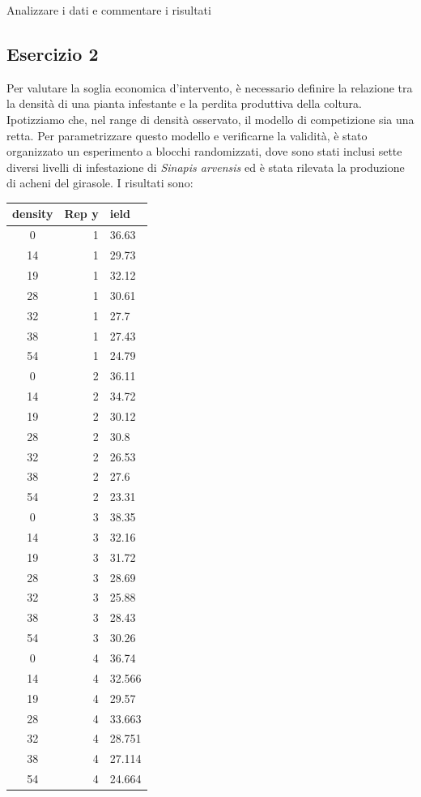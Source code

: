 \documentclass[a4paper,12pt,oneside]{book}
\begin{document}
Analizzare i dati e commentare i risultati

\hypertarget{esercizio-2-7}{%
\subsection{Esercizio 2}\label{esercizio-2-7}}

Per valutare la soglia economica d'intervento, è necessario definire la relazione tra la densità di una pianta infestante e la perdita produttiva della coltura. Ipotizziamo che, nel range di densità osservato, il modello di competizione sia una retta. Per parametrizzare questo modello e verificarne la validità, è stato organizzato un esperimento a blocchi randomizzati, dove sono stati inclusi sette diversi livelli di infestazione di \emph{Sinapis arvensis} ed è stata rilevata la produzione di acheni del girasole. I risultati sono:

\begin{longtable}[]{@{}crl@{}}
\toprule
density & Rep y & ield \\
\midrule
\endhead
0 & 1 & 36.63 \\
14 & 1 & 29.73 \\
19 & 1 & 32.12 \\
28 & 1 & 30.61 \\
32 & 1 & 27.7 \\
38 & 1 & 27.43 \\
54 & 1 & 24.79 \\
0 & 2 & 36.11 \\
14 & 2 & 34.72 \\
19 & 2 & 30.12 \\
28 & 2 & 30.8 \\
32 & 2 & 26.53 \\
38 & 2 & 27.6 \\
54 & 2 & 23.31 \\
0 & 3 & 38.35 \\
14 & 3 & 32.16 \\
19 & 3 & 31.72 \\
28 & 3 & 28.69 \\
32 & 3 & 25.88 \\
38 & 3 & 28.43 \\
54 & 3 & 30.26 \\
0 & 4 & 36.74 \\
14 & 4 & 32.566 \\
19 & 4 & 29.57 \\
28 & 4 & 33.663 \\
32 & 4 & 28.751 \\
38 & 4 & 27.114 \\
54 & 4 & 24.664 \\
\bottomrule
\end{longtable}
\end{document}
